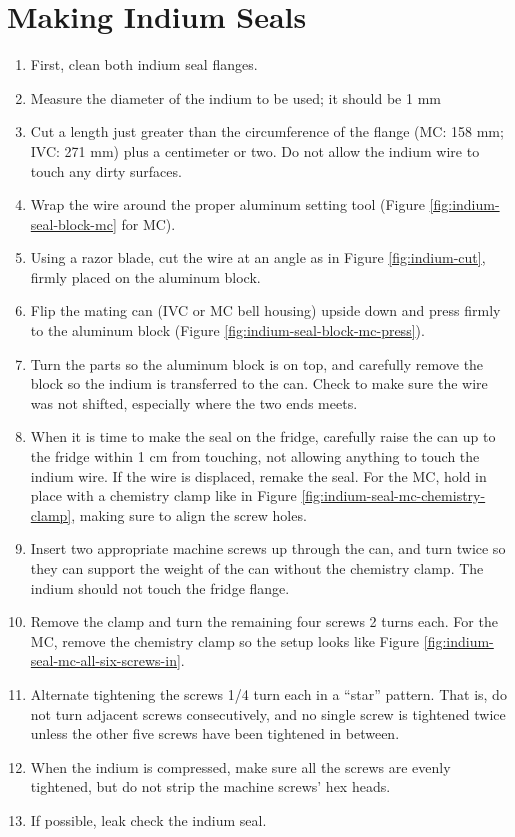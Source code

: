 \section{Making Indium Seals}


\begin{enumerate}
 \item First, clean both indium seal flanges.
 \item Measure the diameter of the indium to be used; it should be 1 mm
 \item Cut a length just greater than the circumference of the flange (MC: 158 mm; IVC: 271 mm) plus a centimeter or two.  Do not allow the indium wire to touch any dirty surfaces.
 \item Wrap the wire around the proper aluminum setting tool (Figure \ref{fig:indium-seal-block-mc} for MC).
 \item Using a razor blade, cut the wire at an angle as in Figure \ref{fig:indium-cut}, firmly placed on the aluminum block.
 \item Flip the mating can (IVC or MC bell housing) upside down and press firmly to the aluminum block (Figure \ref{fig:indium-seal-block-mc-press}).
 \item Turn the parts so the aluminum block is on top, and carefully remove the block so the indium is transferred to the can.  Check to make sure the wire was not shifted, especially where the two ends meets.
 \item When it is time to make the seal on the fridge, carefully raise the can up to the fridge within 1 cm from touching, not allowing anything to touch the indium wire.  If the wire is displaced, remake the seal.  For the MC, hold in place with a chemistry clamp like in Figure \ref{fig:indium-seal-mc-chemistry-clamp}, making sure to align the screw holes.
 \item Insert two appropriate machine screws up through the can, and turn twice so they can support the weight of the can without the chemistry clamp.  The indium should not touch the fridge flange.
 \item Remove the clamp and turn the remaining four screws 2 turns each.  For the MC, remove the chemistry clamp so the setup looks like Figure \ref{fig:indium-seal-mc-all-six-screws-in}.
 \item Alternate tightening the screws 1/4 turn each in a ``star'' pattern.  That is, do not turn adjacent screws consecutively, and no single screw is tightened twice unless the other five screws have been tightened in between.
 \item When the indium is compressed, make sure all the screws are evenly tightened, but do not strip the machine screws' hex heads.
 \item If possible, leak check the indium seal.
\end{enumerate}

